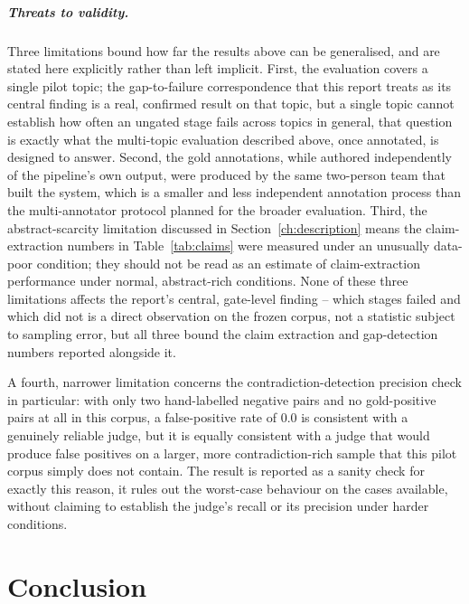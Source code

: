 \documentclass[12pt,a4paper]{report}
\begin{document}
\paragraph{Threats to validity.}
Three limitations bound how far the results above can be generalised, and are
stated here explicitly rather than left implicit. First, the evaluation
covers a single pilot topic; the gap-to-failure correspondence that this
report treats as its central finding is a real, confirmed result on that
topic, but a single topic cannot establish how often an ungated stage fails
across topics in general, that question is exactly what the multi-topic
evaluation described above, once annotated, is designed to answer. Second,
the gold annotations, while authored independently of the pipeline's own
output, were produced by the same two-person team that built the system,
which is a smaller and less independent annotation process than the
multi-annotator protocol planned for the broader evaluation. Third, the
abstract-scarcity limitation discussed in Section~\ref{ch:description} means
the claim-extraction numbers in Table~\ref{tab:claims} were measured under an
unusually data-poor condition; they should not be read as an estimate of
claim-extraction performance under normal, abstract-rich conditions. None of
these three limitations affects the report's central, gate-level finding --
which stages failed and which did not is a direct observation on the frozen
corpus, not a statistic subject to sampling error, but all three bound the
claim extraction and gap-detection numbers reported alongside it.

A fourth, narrower limitation concerns the contradiction-detection precision
check in particular: with only two hand-labelled negative pairs and no
gold-positive pairs at all in this corpus, a false-positive rate of 0.0 is
consistent with a genuinely reliable judge, but it is equally consistent with
a judge that would produce false positives on a larger, more contradiction-rich
sample that this pilot corpus simply does not contain. The result is reported
as a sanity check for exactly this reason, it rules out the worst-case
behaviour on the cases available, without claiming to establish the judge's
recall or its precision under harder conditions.

\chapter{Conclusion}
\label{ch:conclusion}
\end{document}
